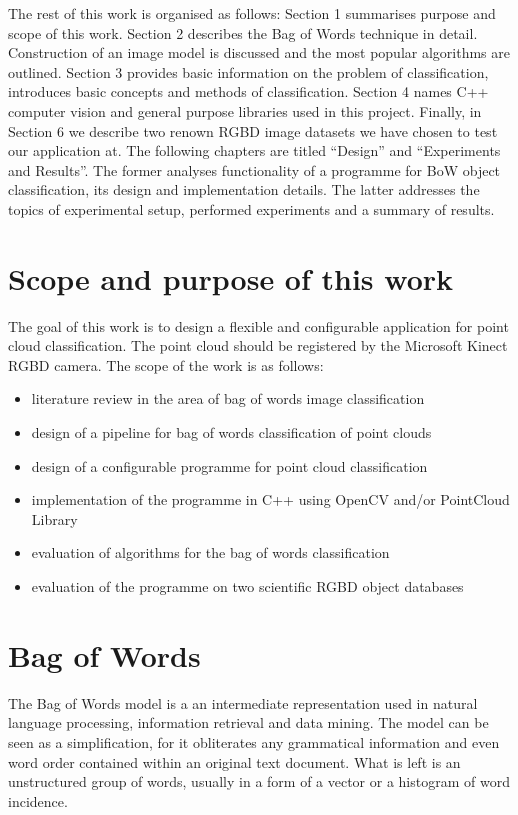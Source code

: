 	The rest of this work is organised as follows: Section 1 summarises purpose and scope of this work. Section 2 describes the Bag of Words technique in detail. Construction of an image model is discussed and the most popular algorithms are outlined. Section 3 provides basic information on the problem of classification, introduces basic concepts and methods of classification. Section 4 names C++ computer vision and general purpose libraries used in this project. Finally, in Section 6 we describe two renown RGBD image datasets we have chosen to test our application at. The following chapters are titled ``Design'' and ``Experiments and Results''. The former analyses functionality of a programme for BoW object classification, its design and implementation details. The latter addresses the topics of experimental setup, performed experiments and a summary of results.
	
	\section{Scope and purpose of this work}
		The goal of this work is to design a flexible and configurable application for point cloud classification. The point cloud should be registered by the Microsoft Kinect RGBD camera. The scope of the work is as follows:
		\begin{itemize}
		\item literature review in the area of bag of words image classification
		\item design of a pipeline for bag of words classification of point clouds
		\item design of a configurable programme for point cloud classification
		\item implementation of the programme in C++ using OpenCV and/or PointCloud Library
		\item evaluation of algorithms for the bag of words classification
		\item evaluation of the programme on two scientific RGBD object databases
		\end{itemize} 
	
\section{Bag of Words}

	The Bag of Words model is a an intermediate representation used in natural language processing, information retrieval and data mining. The model can be seen as a simplification, for it obliterates any grammatical information and even word order contained within an original text document. What is left is an unstructured group of words, usually in a form of a vector or a histogram of word incidence.

